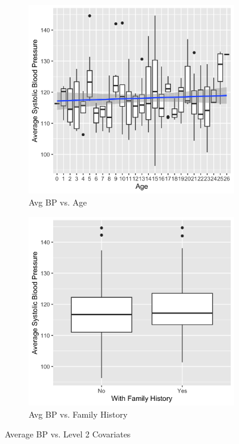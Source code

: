 \documentclass[12pt,twoside,leqno,fleqn,letterpaper]{article}
\theoremstyle{definition}
\theoremstyle{definition}
\begin{document}
\begin{figure}  \ContinuedFloat
    \centering
    \begin{subfigure}{0.48\textwidth}
        \centering
        \includegraphics[width=\textwidth]{pics/bp v age.png}
        \caption{{\small Avg BP vs. Age}}
        \label{fig: bp v age}
    \end{subfigure}
    \hfill
    \begin{subfigure}{0.48\textwidth}
        \centering
        \includegraphics[width=\textwidth]{pics/bp v fh.png}
        \caption{{\small Avg BP vs. Family History}}
        \label{fig: bp v fh}
    \end{subfigure}
    \caption{{\small Average BP vs. Level 2 Covariates}}
    \label{fig: bp v level2 2}
\end{figure}
\end{document}
